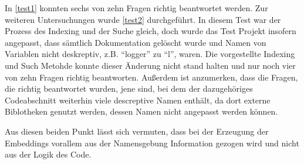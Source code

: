 \documentclass[../main.tex]{subfiles}
\begin{document}
In \ref{test1} konnten sechs von zehn Fragen richtig beantwortet werden.
Zur weiteren Untersuchungen wurde \ref{test2} durchgeführt.
In diesem Test war der Prozess des Indexing und der Suche gleich, doch wurde das Test Projekt insofern angepasst, dass sämtlich Dokumentation gelöscht wurde und Namen von Variablen nicht deskreptiv, z.B. \enquote{logger} zu \enquote{l}, waren.
Die vorgestellte Indexing und Such Metohde konnte dieser Änderung nicht stand halten und nur noch vier von zehn Fragen richtig beantworten.
Außerdem ist anzumerken, dass die Fragen, die richtig beantwortet wurden, jene sind, bei dem der dazugehöriges Codeabschnitt weiterhin viele descreptive Namen enthält, da dort externe Biblotheken genutzt werden, dessen Namen nicht angepasst werden können.


Aus diesen beiden Punkt lässt sich vermuten, dass bei der Erzeugung der Embeddings vorallem aus der Namensgebung Information gezogen wird und nicht aus der Logik des Code.
\end{document}
